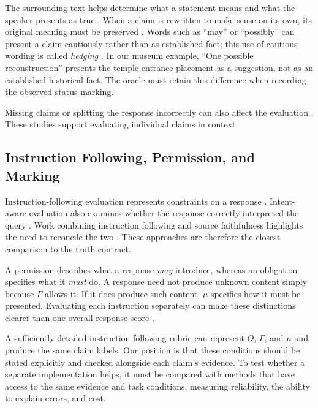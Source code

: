 \documentclass{clv2025}
\begin{document}
The surrounding text helps determine what a statement means and what the
speaker presents as true \citep{stalnaker_assertion_1978,clark_using_1996}.
When a claim is rewritten to make sense on its own, its original meaning
must be preserved \citep{choi_decontextualization_2021}. Words such as
``may'' or ``possibly'' can present a claim cautiously rather than as
established fact; this use of cautious wording is called \emph{hedging}
\citep{hyland_hedging_1996}. In our museum example, ``One possible
reconstruction'' presents the temple-entrance placement as a suggestion,
not as an established historical fact. The oracle must retain this
difference when recording the observed status marking.

Missing claims or splitting the response incorrectly can also affect the
evaluation
\citep{wanner_closer_2024,metropolitansky_claimify_2025}.
These studies support evaluating individual claims in context. %

\subsection{Instruction Following, Permission, and Marking}

Instruction-following evaluation represents constraints on a response
\citep{zhou_ifeval_2023,ye_muldimif_2025}. Intent-aware evaluation also examines
whether the response correctly interpreted the query
\citep{hao_faithqa_2025}. Work combining instruction following and source
faithfulness highlights the need to reconcile the two
\citep{wu_dancing_2024}. These approaches are therefore the closest comparison
to the truth contract.

A permission describes what a response \emph{may} introduce, whereas an
obligation specifies what it \emph{must} do. A response need not produce
unknown content simply because $\Gamma$ allows it. If it does produce such
content, $\mu$ specifies how it must be presented. Evaluating each instruction
separately can make these distinctions clearer than one overall response score
\citep{lee_mcjudgebench_2026}.

A sufficiently detailed instruction-following rubric can represent $O$,
$\Gamma$, and $\mu$ and produce the same claim labels. Our position is that
these conditions should be stated explicitly and checked alongside each
claim's evidence. To test whether a separate implementation helps, it must
be compared with methods that have access to the same evidence and task
conditions, measuring reliability, the ability to explain errors, and cost.
\end{document}
